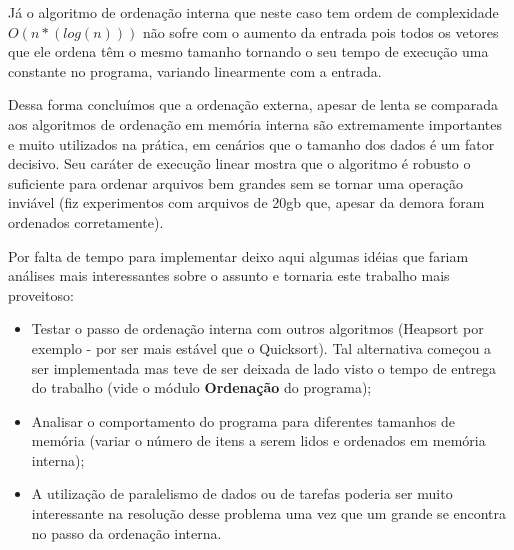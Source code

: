 \documentclass[12pt]{article}
\begin{document}
Já o algoritmo de ordenação interna que neste caso tem ordem de complexidade $O(n*(log(n)))$ não sofre
 com o aumento da entrada pois todos os vetores que ele ordena têm o mesmo tamanho tornando o seu tempo de execução uma constante no programa, variando linearmente com a entrada.
 
Dessa forma concluímos que a ordenação externa, apesar de lenta se comparada aos algoritmos de ordenação 
em memória interna são extremamente importantes e muito utilizados na prática, em cenários que o tamanho
 dos dados é um fator decisivo. Seu caráter de execução linear mostra que o algoritmo é robusto o
 suficiente para ordenar arquivos bem grandes sem se tornar uma operação inviável (fiz experimentos com arquivos de 20gb que, apesar da demora foram ordenados corretamente).

Por falta de tempo para implementar deixo aqui algumas idéias que fariam análises mais interessantes sobre o assunto e tornaria este trabalho mais proveitoso:
\begin{itemize}
\item Testar o passo de ordenação interna com outros algoritmos (Heapsort por exemplo - por
ser mais estável que o Quicksort). Tal alternativa começou a ser implementada mas teve de ser deixada de lado visto o tempo de entrega do trabalho (vide o módulo \textbf{Ordenação} do programa);
\item Analisar o comportamento do programa para diferentes tamanhos de memória (variar o 
número de itens a serem lidos e ordenados em memória interna);
\item A utilização de paralelismo de dados ou de tarefas poderia ser muito interessante na resolução desse problema uma vez que um grande se encontra no passo da ordenação interna.
\end{itemize}
\end{document}
